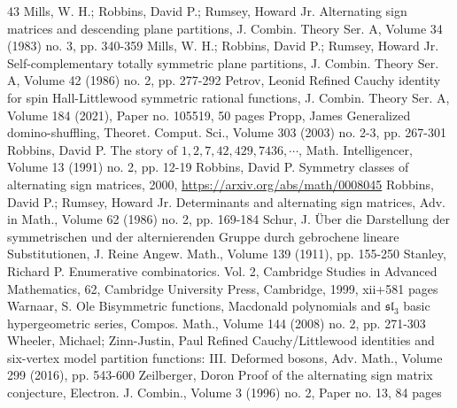 \begin{thebibliography}{43}
 Mills, W. H.; Robbins, David P.; Rumsey, Howard Jr. Alternating sign matrices and descending plane partitions, J. Combin. Theory Ser. A, Volume 34 (1983) no. 3, pp. 340-359
 Mills, W. H.; Robbins, David P.; Rumsey, Howard Jr. Self-complementary totally symmetric plane partitions, J. Combin. Theory Ser. A, Volume 42 (1986) no. 2, pp. 277-292
 Petrov, Leonid Refined Cauchy identity for spin Hall-Littlewood symmetric rational functions, J. Combin. Theory Ser. A, Volume 184 (2021), Paper no. 105519, 50 pages
 Propp, James Generalized domino-shuffling, Theoret. Comput. Sci., Volume 303 (2003) no. 2-3, pp. 267-301
 Robbins, David P. The story of $1,2,7,42,429,7436,\cdots $, Math. Intelligencer, Volume 13 (1991) no. 2, pp. 12-19
 Robbins, David P. Symmetry classes of alternating sign matrices, 2000, \url{https://arxiv.org/abs/math/0008045}
 Robbins, David P.; Rumsey, Howard Jr. Determinants and alternating sign matrices, Adv. in Math., Volume 62 (1986) no. 2, pp. 169-184
 Schur, J. Über die Darstellung der symmetrischen und der alternierenden Gruppe durch gebrochene lineare Substitutionen, J. Reine Angew. Math., Volume 139 (1911), pp. 155-250
 Stanley, Richard P. Enumerative combinatorics. Vol. 2, Cambridge Studies in Advanced Mathematics, 62, Cambridge University Press, Cambridge, 1999, xii+581 pages
 Warnaar, S. Ole Bisymmetric functions, Macdonald polynomials and $\mathfrak{sl}_3$ basic hypergeometric series, Compos. Math., Volume 144 (2008) no. 2, pp. 271-303
 Wheeler, Michael; Zinn-Justin, Paul Refined Cauchy/Littlewood identities and six-vertex model partition functions: III. Deformed bosons, Adv. Math., Volume 299 (2016), pp. 543-600
 Zeilberger, Doron Proof of the alternating sign matrix conjecture, Electron. J. Combin., Volume 3 (1996) no. 2, Paper no. 13, 84 pages
\end{thebibliography}
